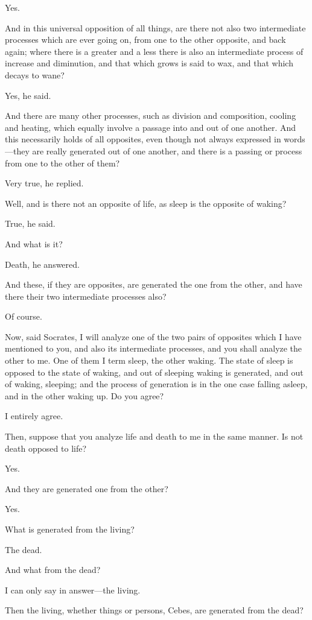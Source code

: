 Yes.

And in this universal opposition of all things, are there not also two
intermediate processes which are ever going on, from one to the other
opposite, and back again; where there is a greater and a less there is
also an intermediate process of increase and diminution, and that which
grows is said to wax, and that which decays to wane?

Yes, he said.

And there are many other processes, such as division and composition,
cooling and heating, which equally involve a passage into and out of one
another. And this necessarily holds of all opposites, even though not
always expressed in words—they are really generated out of one
another, and there is a passing or process from one to the other of them?

Very true, he replied.

Well, and is there not an opposite of life, as sleep is the opposite of
waking?

True, he said.

And what is it?

Death, he answered.

And these, if they are opposites, are generated the one from the other,
and have there their two intermediate processes also?

Of course.

Now, said Socrates, I will analyze one of the two pairs of opposites which
I have mentioned to you, and also its intermediate processes, and you
shall analyze the other to me. One of them I term sleep, the other waking.
The state of sleep is opposed to the state of waking, and out of sleeping
waking is generated, and out of waking, sleeping; and the process of
generation is in the one case falling asleep, and in the other waking up.
Do you agree?

I entirely agree.

Then, suppose that you analyze life and death to me in the same manner. Is
not death opposed to life?

Yes.

And they are generated one from the other?

Yes.

What is generated from the living?

The dead.

And what from the dead?

I can only say in answer—the living.

Then the living, whether things or persons, Cebes, are generated from the
dead?

